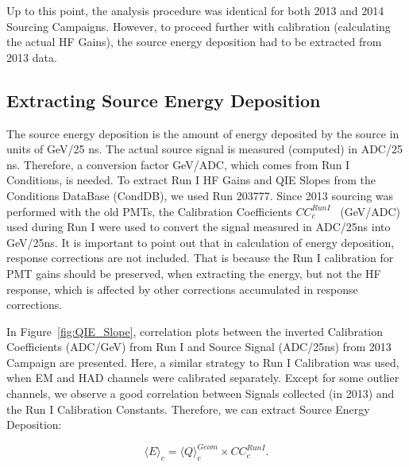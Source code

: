 Up to this point, the analysis procedure was identical for both 2013 and 2014
Sourcing Campaigns. However, to proceed further with calibration (calculating the
actual HF Gains), the source energy deposition had to be extracted from 2013 data.

\subsection{Extracting Source Energy Deposition}
The source energy deposition is the amount of energy deposited by the source in
units of GeV/25 ns. The actual source signal is measured (computed) in
ADC/25 ns. Therefore, a conversion factor GeV/ADC, which comes from
Run I Conditions, is needed. To extract Run I HF Gains and QIE Slopes from the Conditions DataBase (CondDB), we used Run 203777. Since 2013 sourcing was performed with the old PMTs, the
Calibration Coefficients ${CC}^{Run I}_{c}$~ (GeV/ADC) used during Run I were used to convert
the signal measured in ADC/25\unit{ns} into GeV/25\unit{ns}. It is important to point out that in calculation of energy deposition, response corrections are not included. That is because the Run I calibration for PMT gains should be preserved, when extracting the energy, but not the HF response, which is affected by other corrections accumulated in response corrections.

In Figure~\ref{fig:QIE_Slope}, correlation plots between the inverted Calibration
Coefficients (ADC/GeV) from Run I and Source Signal (ADC/25\unit{ns}) from 2013
Campaign are presented. Here, a similar strategy to Run I Calibration was used, when
EM and HAD channels were calibrated separately. Except for some outlier channels,
we observe a good correlation between Signals collected (in 2013) and the Run I
Calibration Constants. Therefore, we can extract Source Energy Deposition:
\begin{center}
	\begin{equation}
		\label{eq:Edep}
		{\langle{E}\rangle}_{c} = {\langle{Q}\rangle}^{Geom}_{c} \times {CC^{Run I}_{c}}.
	\end{equation}
\end{center}

